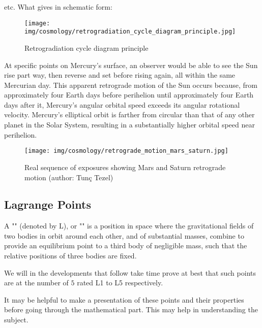 	etc. What gives in schematic form:
	\begin{figure}[H]
		\centering
		\texttt{[image: img/cosmology/retrogradiation\_cycle\_diagram\_principle.jpg]}
		\caption[]{Retrogradiation cycle diagram principle}	
	\end{figure}
	\begin{tcolorbox}[title=Remark,colframe=black,arc=10pt]
	At specific points on Mercury's surface, an observer would be able to see the Sun rise part way, then reverse and set before rising again, all within the same Mercurian day. This apparent retrograde motion of the Sun occurs because, from approximately four Earth days before perihelion until approximately four Earth days after it, Mercury's angular orbital speed exceeds its angular rotational velocity. Mercury's elliptical orbit is farther from circular than that of any other planet in the Solar System, resulting in a substantially higher orbital speed near perihelion.
	\end{tcolorbox}
	\begin{figure}[H]
		\centering
		\texttt{[image: img/cosmology/retrograde\_motion\_mars\_saturn.jpg]}
		\caption[Real sequence of exposures showing Mars and Saturn retrograde motion]{Real sequence of exposures showing Mars and Saturn retrograde motion (author: Tunç Tezel)}
	\end{figure}
	
	\pagebreak
	\subsection{Lagrange Points}
	A "" (denoted by L), or "" is a position in space where the gravitational fields of two bodies in orbit around each other, and of substantial masses, combine to provide an equilibrium point to a third body of negligible mass, such that the relative positions of three bodies are fixed.

	We will in the developments that follow take time prove at best that such points are at the number of $5$ rated L1 to L5 respectively.

	It may be helpful to make a presentation of these points and their properties before going through the mathematical part. This may help in understanding the subject.

